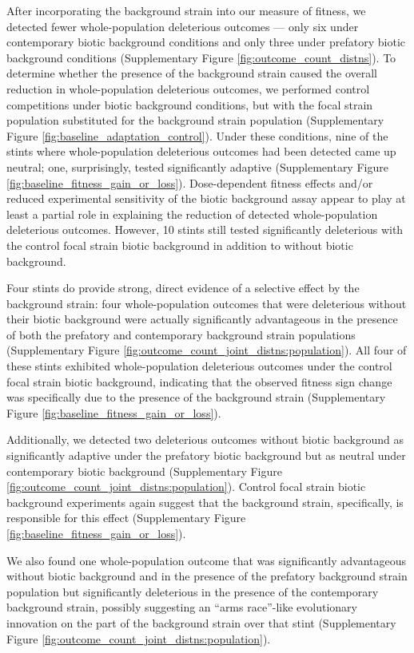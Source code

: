 After incorporating the background strain into our measure of fitness, we detected fewer whole-population deleterious outcomes --- only six under contemporary biotic background conditions and only three under prefatory biotic background conditions (Supplementary Figure \ref{fig:outcome_count_distns}).
To determine whether the presence of the background strain caused the overall reduction in whole-population deleterious outcomes, we performed control competitions under biotic background conditions, but with the focal strain population substituted for the background strain population (Supplementary Figure \ref{fig:baseline_adaptation_control}).
Under these conditions, nine of the stints where whole-population deleterious outcomes had been detected came up neutral;
one, surprisingly, tested significantly adaptive (Supplementary Figure \ref{fig:baseline_fitness_gain_or_loss}).
Dose-dependent fitness effects and/or reduced experimental sensitivity of the biotic background assay appear to play at least a partial role in explaining the reduction of detected whole-population deleterious outcomes.
However, 10 stints still tested significantly deleterious with the control focal strain biotic background in addition to without biotic background.

Four stints do provide strong, direct evidence of a selective effect by the background strain: four whole-population outcomes that were deleterious without their biotic background were actually significantly advantageous in the presence of both the prefatory and contemporary background strain populations (Supplementary Figure \ref{fig:outcome_count_joint_distns:population}).
All four of these stints exhibited whole-population deleterious outcomes under the control focal strain biotic background, indicating that the observed fitness sign change was specifically due to the presence of the background strain (Supplementary Figure \ref{fig:baseline_fitness_gain_or_loss}).

Additionally, we detected two deleterious outcomes without biotic background as significantly adaptive under the prefatory biotic background but as neutral under contemporary biotic background (Supplementary Figure \ref{fig:outcome_count_joint_distns:population}).
Control focal strain biotic background experiments again suggest that the background strain, specifically, is responsible for this effect (Supplementary Figure \ref{fig:baseline_fitness_gain_or_loss}).

We also found one whole-population outcome that was significantly advantageous without biotic background and in the presence of the prefatory background strain population but significantly deleterious in the presence of the contemporary background strain, possibly suggesting an ``arms race''-like evolutionary innovation on the part of the background strain over that stint (Supplementary Figure \ref{fig:outcome_count_joint_distns:population}).

